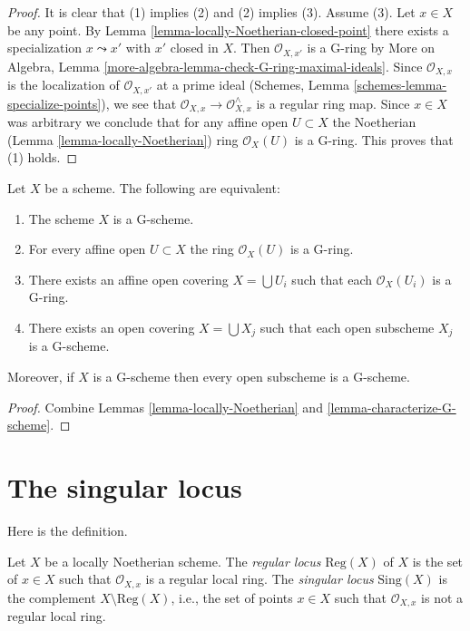 \begin{proof}
It is clear that (1) implies (2) and (2) implies (3).
Assume (3). Let $x \in X$ be any point. By
Lemma \ref{lemma-locally-Noetherian-closed-point}
there exists a specialization $x \leadsto x'$ with $x'$ closed
in $X$. Then $\mathcal{O}_{X, x'}$ is a G-ring by
More on Algebra, Lemma \ref{more-algebra-lemma-check-G-ring-maximal-ideals}.
Since $\mathcal{O}_{X, x}$ is the localization of $\mathcal{O}_{X, x'}$
at a prime ideal (Schemes, Lemma \ref{schemes-lemma-specialize-points}),
we see that $\mathcal{O}_{X, x} \to \mathcal{O}_{X, x}^\wedge$
is a regular ring map. Since $x \in X$ was arbitrary we conclude
that for any affine open $U \subset X$ the Noetherian
(Lemma \ref{lemma-locally-Noetherian}) ring $\mathcal{O}_X(U)$ is a G-ring.
This proves that (1) holds.
\end{proof}

\begin{lemma}
\label{lemma-locally-G-scheme}
Let $X$ be a scheme. The following are equivalent:
\begin{enumerate}
\item The scheme $X$ is a G-scheme.
\item For every affine open $U \subset X$ the ring $\mathcal{O}_X(U)$
is a G-ring.
\item There exists an affine open covering $X = \bigcup U_i$ such that
each $\mathcal{O}_X(U_i)$ is a G-ring.
\item There exists an open covering $X = \bigcup X_j$
such that each open subscheme $X_j$ is a G-scheme.
\end{enumerate}
Moreover, if $X$ is a G-scheme then every open subscheme is a
G-scheme.
\end{lemma}

\begin{proof}
Combine Lemmas \ref{lemma-locally-Noetherian}
and \ref{lemma-characterize-G-scheme}.
\end{proof}




\section{The singular locus}
\label{section-singular-locus}

\noindent
Here is the definition.

\begin{definition}
\label{definition-singular-locus}
Let $X$ be a locally Noetherian scheme. The {\it regular locus}
$\text{Reg}(X)$ of $X$ is the set of $x \in X$ such that $\mathcal{O}_{X, x}$
is a regular local ring. The {\it singular locus} $\text{Sing}(X)$ is the
complement $X \setminus \text{Reg}(X)$, i.e., the set of points $x \in X$
such that $\mathcal{O}_{X, x}$ is not a regular local ring.
\end{definition}

